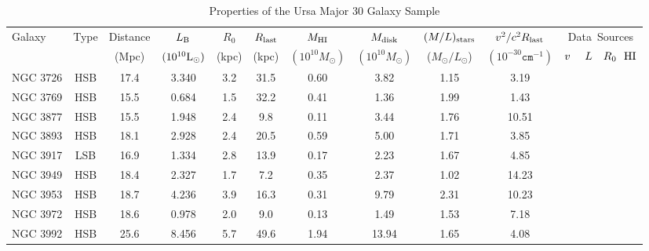 \documentclass[preprint,aps]{revtex4}
\begin{document}
\begin{table}
\caption{Properties of the Ursa Major 30 Galaxy Sample}
\centering
\begin{tabular}{l c c c c c c c c c c} 
\hline\hline
\phantom{00}Galaxy  & \phantom{0}Type \phantom{0}&Distance  & $L_{\rm  B}$ & $R_0$  & $R_{\rm last} $ &  $M_{\rm HI} $ & $M_{\rm disk}$ &  $ 
(M/L) _{\rm stars}$ & $v^2 / c^2 R_{\rm last}$ & Data~Sources \\  
& &  (Mpc)  &  $(10^{10}{\rm L}_{\odot})$&(kpc) & (kpc) & {$(10^{10} M_\odot)$} & {$(10^{10}
M_\odot)$} & ({$M_{\odot}/L_{\odot}$}) & {$(10^{-30}\texttt{cm}^{-1})$} & $v~~~~L~~~R_0~~{\rm HI}$\\
\hline
NGC 3726 &HSB& 17.4 & 3.340    & 3.2 & 31.5 & 0.60 & \phantom{0}3.82 & 1.15 &
\phantom{0}3.19 &   \cite{Verheijen2001} \cite{Sanders1998} \cite{Tully1997a} \cite{Sanders1998}  \\
NGC 3769 &HSB&15.5& 0.684   &1.5 & 32.2 &0.41 &\phantom{0}1.36 &1.99 &\phantom{0}1.43
&   \cite{Verheijen2001} \cite{Sanders1998} \cite{Tully1997a} \cite{Sanders1998}    
\\
NGC 3877&HSB& 15.5 &   1.948   & 2.4 & \phantom{0}9.8 & 0.11& \phantom{0}3.44 & 1.76 &
10.51 &     \cite{Verheijen2001} \cite{Sanders1998} \cite{Tully1997a} \cite{Sanders1998}  
\\
NGC 3893&HSB & 18.1 &   2.928   & 2.4 & 20.5 & 0.59& \phantom{0}5.00 & 1.71 &
\phantom{0}3.85 &   \cite{Verheijen2001} \cite{Sanders1998} \cite{Tully1997a} \cite{Sanders1998}    \\
NGC 3917&LSB& 16.9 &  1.334   &2.8 & 13.9 & 0.17 & \phantom{0}2.23 &1.67 &
\phantom{0}4.85 &   \cite{Verheijen2001} \cite{Sanders1998} \cite{Tully1997a} \cite{Sanders1998}    \\
NGC 3949&HSB& 18.4 &  2.327    & 1.7 & \phantom{0}7.2 & 0.35 & \phantom{0}2.37 &1.02
&14.23&   \cite{Verheijen2001} \cite{Sanders1998} \cite{Tully1997a} \cite{Sanders1998}   
 \\
NGC 3953 &HSB& 18.7 &  4.236    & 3.9 & 16.3 & 0.31 &\phantom{0}9.79 &2.31& 10.23 &   \cite{Verheijen2001} \cite{Sanders1998} \cite{Tully1997a} \cite{Sanders1998}    
\\
NGC 3972&HSB& 18.6 &    0.978  & 2.0 &\phantom{0}9.0 & 0.13 & \phantom{0}1.49&1.53 &
\phantom{0}7.18 &    \cite{Verheijen2001} \cite{Sanders1998} \cite{Tully1997a} \cite{Sanders1998}   
\\
NGC 3992 &HSB& 25.6 &   8.456   & 5.7 & 49.6 & 1.94 & 13.94 &  1.65 & \phantom{0}4.08 &   \cite{Verheijen2001} \cite{Sanders1998} \cite{Tully1997a} \cite{Sanders1998}    

\end{tabular}
\end{table}
\end{document}
